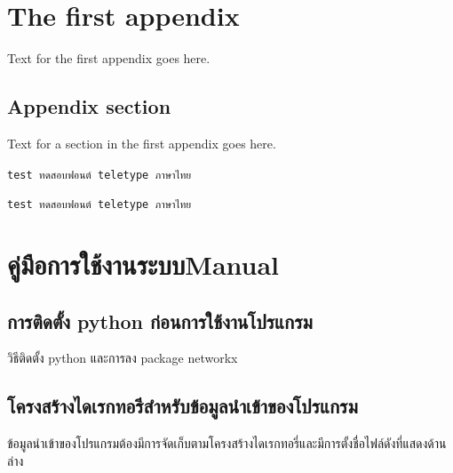 \chapter{The first appendix}

Text for the first appendix goes here.

\section{Appendix section}

Text for a section in the first appendix goes here.

\verb+test ทดสอบฟอนต์ teletype ภาษาไทย+

\texttt{test ทดสอบฟอนต์ teletype ภาษาไทย}

\chapter{\ifcpe คู่มือการใช้งานระบบ\else Manual\fi}
\section{การติดตั้ง python ก่อนการใช้งานโปรแกรม}

วิธีติดตั้ง python และการลง package networkx

\section{โครงสร้างไดเรกทอรีสำหรับข้อมูลนำเข้าของโปรแกรม}
\label{apd:snd_apd}
ข้อมูลนำเข้าของโปรแกรมต้องมีการจัดเก็บตามโครงสร้างไดเรกทอรี่และมีการตั้งชื่อไฟล์ดังที่แสดงด้านล่าง

